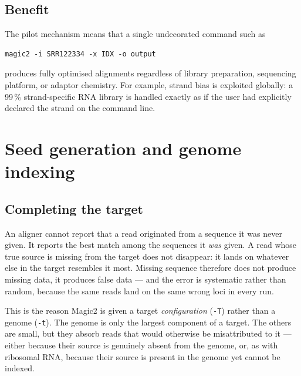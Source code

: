 \documentclass[11pt]{article}
\begin{document}
\subsection{Benefit}
\label{sec:pilot_benefit}

The pilot mechanism means that a single undecorated command such as
\begin{lstlisting}
magic2 -i SRR122334 -x IDX -o output
\end{lstlisting}
produces fully optimised alignments regardless of library
preparation, sequencing platform, or adaptor chemistry.
For example, strand bias is exploited globally: a 99\,\%
strand-specific RNA library is handled exactly as if
the user had explicitly declared the strand on the command line.

\section{Seed generation and genome indexing}
\label{sec:seeds}

\subsection{Completing the target}
\label{sec:target}

An aligner cannot report that a read originated from a sequence it was
never given.
It reports the best match among the sequences it \emph{was} given.
A read whose true source is missing from the target does not disappear:
it lands on whatever else in the target resembles it most.
Missing sequence therefore does not produce missing data, it produces
false data --- and the error is systematic rather than random, because
the same reads land on the same wrong loci in every run.

This is the reason Magic2 is given a target \emph{configuration}
(\texttt{-T}) rather than a genome (\texttt{-t}).
The genome is only the largest component of a target.
The others are small, but they absorb reads that would otherwise be
misattributed to it --- either because their source is genuinely absent
from the genome, or, as with ribosomal RNA, because their source is
present in the genome yet cannot be indexed.
\end{document}
